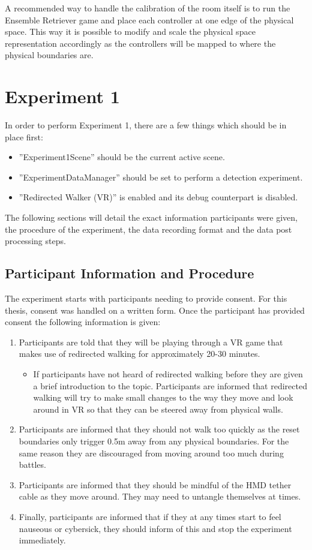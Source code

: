 A recommended way to handle the calibration of the room itself is to run the Ensemble Retriever game and place each controller at one edge of the physical space. This way it is possible to modify and scale the physical space representation accordingly as the controllers will be mapped to where the physical boundaries are. 

\section{Experiment 1}
In order to perform Experiment 1, there are a few things which should be in place first:

\begin{itemize}
    \item ''Experiment1Scene'' should be the current active scene.
    \item ''ExperimentDataManager'' should be set to perform a detection experiment.
    \item ''Redirected Walker (VR)'' is enabled and its debug counterpart is disabled.
\end{itemize}

The following sections will detail the exact information participants were given, the procedure of the experiment, the data recording format and the data post processing steps.

\subsection{Participant Information and Procedure}\label{sec:ex1information}
The experiment starts with participants needing to provide consent. For this thesis, consent was handled on a written form. Once the participant has provided consent the following information is given:

\begin{enumerate}
    \item Participants are told that they will be playing through a VR game that makes use of redirected walking for approximately 20-30 minutes. 
    \begin{itemize}
        \item If participants have not heard of redirected walking before they are given a brief introduction to the topic. Participants are informed that redirected walking will try to make small changes to the way they move and look around in VR so that they can be steered away from physical walls. 
    \end{itemize}  
    \item Participants are informed that they should not walk too quickly as the reset boundaries only trigger 0.5m away from any physical boundaries. For the same reason they are discouraged from moving around too much during battles.
    \item Participants are informed that they should be mindful of the HMD tether cable as they move around. They may need to untangle themselves at times.
    \item Finally, participants are informed that if they at any times start to feel nauseous or cybersick, they should inform of this and stop the experiment immediately. 
\end{enumerate}


